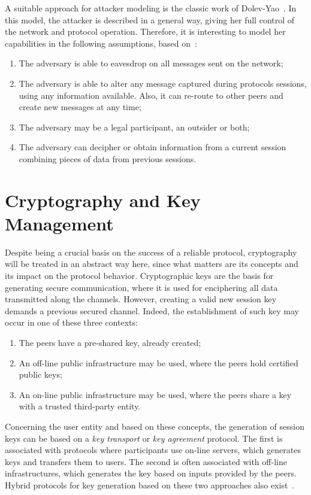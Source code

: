 A suitable approach for attacker modeling is the classic work of Dolev-Yao~\cite{DolevYao81}. In this model, the attacker is described in a general way, giving her full control of the network and protocol operation. Therefore, it is interesting to model her capabilities in the following assumptions, based on~\cite{BoydMathuria2008}:

\begin{enumerate}
  \item The adversary is able to eavesdrop on all messages sent on the network;
  \item The adversary is able to alter any message captured during protocols sessions, using any information available. Also, it can re-route to other peers and create new messages at any time;
  \item The adversary may be a legal participant, an outsider or both;
  \item The adversary can decipher or obtain information from a current session combining pieces of data from previous sessions.
\end{enumerate}





\section{Cryptography and Key Management}
Despite being a crucial basis on the success of a reliable protocol, cryptography will be treated in an abstract way here, since what matters are its concepts and its impact on the protocol behavior. Cryptographic keys are the basis for generating secure communication, where it is used for enciphering all data transmitted along the channels. However, creating a valid new session key demands a previous secured channel. Indeed, the establishment of such key may occur in one of these three contexts:

\begin{enumerate}
  \item The peers have a pre-shared key, already created;
  \item An off-line public infrastructure may be used, where the peers hold certified public keys;
  \item An on-line public infrastructure may be used, where the peers share a key with a trusted third-party entity.
\end{enumerate}

Concerning the user entity and based on these concepts, the generation of session keys can be based on a \textit{key transport} or \textit{key agreement} protocol. The first is associated with protocols where participants use on-line servers, which generates keys and transfers them to users. The second is often associated with off-line infrastructures, which generates the key based on inputs provided by the peers. Hybrid protocols for key generation based on these two approaches also exist~\cite{BoydMathuria2008}.





